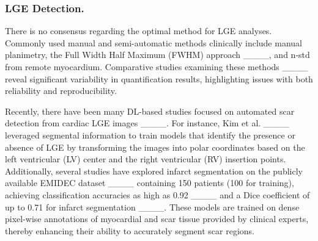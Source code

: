 \subsubsection{LGE Detection.}

There is no consensus regarding the optimal method for LGE analyses. Commonly used manual and semi-automatic methods clinically include manual planimetry, the Full Width Half Maximum (FWHM) approach ____, and n-std from remote myocardium. Comparative studies examining these methods ____ reveal significant variability in quantification results, highlighting issues with both reliability and reproducibility.

Recently, there have been many DL-based studies focused on automated scar detection from cardiac LGE images ____. For instance, Kim et al. ____ leveraged segmental information to train models that identify the presence or absence of LGE by transforming the images into polar coordinates based on the left ventricular (LV) center and the right ventricular (RV) insertion points. Additionally, several studies have explored infarct segmentation on the publicly available EMIDEC dataset ____ containing 150 patients (100 for training), achieving classification accuracies as high as 0.92 ____ and a Dice coefficient of up to 0.71 for infarct segmentation ____. These models are trained on dense pixel-wise annotations of myocardial and scar tissue provided by clinical experts, thereby enhancing their ability to accurately segment scar regions.